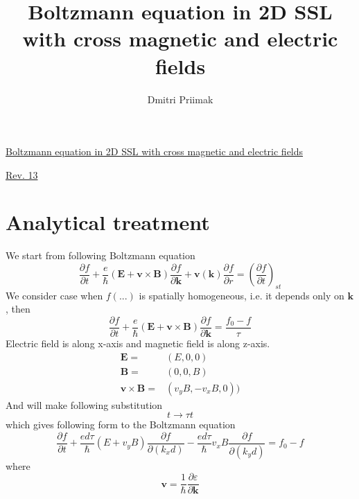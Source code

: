 \documentclass[40pt,letterpaper,physrev]{article}
\author{Dmitri Priimak}
\title{Boltzmann equation in 2D SSL with cross magnetic and electric fields}
\begin{document}
\newcommand{\ddx}[2] {
	\frac{\text{d}#1}{\text{d}#2}
}
\newcommand{\ddt}[1] {
	\frac{\text{d}#1}{\text{d}t}
}
\newcommand{\dtwodt}[1] {
	\frac{\text{d}^{2}#1}{\text{d}t^{2}}
}
 \begin{center}
  \underline{Boltzmann equation in 2D SSL with cross magnetic and electric fields}
 \end{center}
  \begin{center}
    \underline{Rev. 13}
  \end{center}
  \section{Analytical treatment}
	We start from following Boltzmann equation
    \begin{equation}\label{eq:boltzmann}
     \frac{\partial f}{\partial t}+
     \frac{e}{\hbar}\left ( \mathbf{E} + \mathbf{v}\times\mathbf{B} \right ) \frac{\partial f}{\partial\mathbf{k}}+
     \mathbf{v}(\mathbf{k})\frac{\partial f}{\partial r} = \left ( \frac{\partial f}{\partial t} \right )_{st}
    \end{equation}
    We consider case when $f(...)$ is spatially homogeneous, i.e. it depends only on $\mathbf{k}$, then
    \begin{equation}\label{eq:boltzmann_homo}
     \frac{\partial f}{\partial t}+
     \frac{e}{\hbar}\left ( \mathbf{E} + \mathbf{v}\times\mathbf{B} \right ) \frac{\partial f}{\partial\mathbf{k}}
     = \frac{f_0 - f}{\tau}
    \end{equation}
    Electric field is along x-axis and magnetic field is along z-axis.
    \begin{align}
     \mathbf{E}=&(E,0,0) \\
     \mathbf{B}=&(0,0,B) \\
     \mathbf{v}\times\mathbf{B}=&(v_y B, -v_x B, 0))
    \end{align}
    And will make following substitution
    \begin{equation}
     t \to \tau t
    \end{equation}
    which gives following form to the Boltzmann equation
    \begin{equation}
     \frac{\partial f}{\partial t}+
     \frac{ed\tau}{\hbar}(E+v_{y}B)\frac{\partial f}{\partial(k_x d)}-
     \frac{ed\tau}{\hbar}v_{x}B\frac{\partial f}{\partial(k_y d)}
     = f_0 - f
    \end{equation}
    where 
    \begin{equation}
     \mathbf{v}=\frac{1}{\hbar}\frac{\partial\varepsilon}{\partial\mathbf{k}}
    \end{equation}
\end{document}
